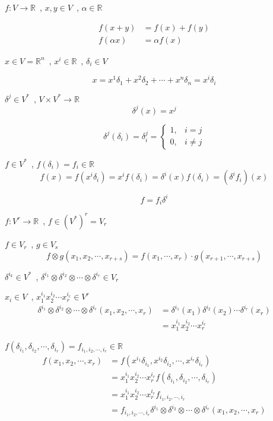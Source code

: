 \documentclass[12pt,a4paper]{article}
\author{Jiejia Xu}
\begin{document}
$f:V \longrightarrow \mathbb{R}$ \,, $x,y\in V$ \,, $\alpha \in \mathbb{R}$

\begin{align*}
	f(x+y) &= f(x) + f(y)\\
	f(\alpha x) &= \alpha f(x)
\end{align*}


$ x \in V = \mathbb{R}^n $ \,, $x^i \in \mathbb{R} $ \,, $ \delta_i \in V $

\[
x = x^1\delta_1+x^2\delta_2+\cdots+x^n\delta_n = x^i\delta_i
\]

$\delta^j \in V^*$ \,, $V \times V^* \longrightarrow \mathbb{R}$
\[
\delta^j(x) = x^j
\]

\[
\delta^j(\delta_i) = \delta^j_i = 
	\begin{cases}
		1, & i = j \\
		0, & i \neq j
	\end{cases} 
\]

$f \in V^*$ \,, $f(\delta_i) = f_i \in \mathbb{R} $
\[
f(x) = f(x^i\delta_i) = x^if(\delta_i) = \delta^i(x)f(\delta_i) = (\delta^if_i)(x)
\]

\[
f = f_i\delta^i
\]

$f:V^r \longrightarrow \mathbb{R}$ \,, $f \in (V^*)^r = V_r$

$f\in V_r$ \,, $g \in V_s$
\[
	f \otimes g (x_1,x_2,\cdots,x_{r+s}) = f(x_1,\cdots,x_r)\cdot g(x_{r+1},\cdots,x_{r+s})
\]

$\delta^{i_k} \in V^*$ \,, $\delta^{i_1} \otimes \delta^{i_2} \otimes \cdots \otimes \delta^{i_r} \in V_r$

$x_i \in V$ \,, $ x^{i_1}_1x^{i_2}_2\cdots x^{i_r}_r \in V^r$
\begin{align*}
\delta^{i_1} \otimes \delta^{i_2} \otimes \cdots \otimes \delta^{i_r} (x_1,x_2,\cdots,x_r) &= \delta^{i_1}(x_1)\delta^{i_2}(x_2)\cdots\delta^{i_r}(x_r) \\
&= x^{i_1}_1x^{i_2}_2\cdots x^{i_r}_r
\end{align*}

$f(\delta_{i_1},\delta_{i_2},\cdots,\delta_{i_r}) = f_{i_1,i_2,\cdots,i_r}
\in \mathbb{R}
$
\begin{align*}
f(x_1,x_2,\cdots,x_r)&=f(x^{i_1}\delta_{i_1},x^{i_2}\delta_{i_2},\cdots,x^{i_r}\delta_{i_r})\\
&=x^{i_1}_1x^{i_2}_2\cdots x^{i_r}_r f(\delta_{i_1},\delta_{i_2},\cdots,\delta_{i_r})\\
&=x^{i_1}_1x^{i_2}_2\cdots x^{i_r}_r f_{i_1,i_2,\cdots,i_r}\\
&=f_{i_1,i_2,\cdots,i_r} \delta^{i_1} \otimes \delta^{i_2} \otimes \cdots \otimes \delta^{i_r} (x_1,x_2,\cdots,x_r)
\end{align*}
\end{document}
